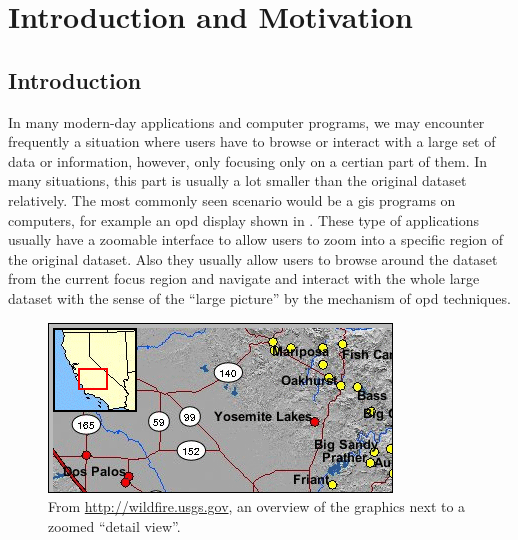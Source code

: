 
\chapter{Introduction and Motivation} %

\label{Chapter1} %


\section{Introduction}

In many modern-day applications and computer programs, we may encounter frequently a situation where users have to browse or interact with a large set of data or information, however, only focusing only on a certian part of them. In many situations, this part is usually a lot smaller than the original dataset relatively. The most commonly seen scenario would be a \gls{gis} programs on computers, for example an \gls{opd} display shown in . These type of applications usually have a zoomable interface to allow users to zoom into a specific region of the original dataset. Also they usually allow users to browse around the dataset from the current focus region and navigate and interact with the whole large dataset with the sense of the ``large picture'' by the mechanism of \gls{opd} techniques.

\begin{figure}[th]
\centering
\includegraphics{Figures/Chapter1/usgsmap.png}
\decoRule
\caption[Overview Plus Details On Map]{From \url{http://wildfire.usgs.gov}, an overview of the graphics next to a zoomed ``detail view''.}
\label{fig:usgsmap}
\end{figure}

